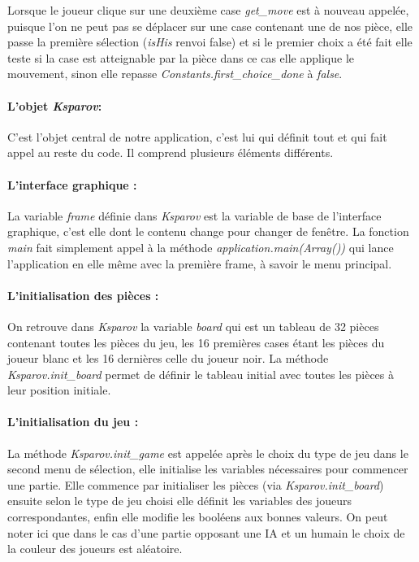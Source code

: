 \documentclass[a4paper]{article}
\begin{document}
Lorsque le joueur clique sur une deuxième case \textit{get\_move} est à nouveau appelée, puisque l'on ne peut pas se déplacer sur une case contenant une de nos pièce, elle passe la première sélection (\textit{isHis} renvoi false) et si le premier choix a été fait elle teste si la case est atteignable par la pièce dans ce cas elle applique le mouvement, sinon elle repasse \textit{Constants.first\_choice\_done} à \textit{false}. 

\paragraph{L'objet \textit{Ksparov}:}C'est l'objet central de notre application, c'est lui qui définit tout et qui fait appel au reste du code. Il comprend plusieurs éléments différents. 

\paragraph{L'interface graphique :}La variable \textit{frame} définie dans \textit{Ksparov} est la variable de base de l'interface graphique, c'est elle dont le contenu change pour changer de fenêtre. La fonction \textit{main} fait simplement appel à la méthode \textit{application.main(Array())} qui lance l'application en elle même avec la première frame, à savoir le menu principal. 

\paragraph{L'initialisation des pièces :}On retrouve dans \textit{Ksparov} la variable \textit{board} qui est un tableau de 32 pièces contenant toutes les pièces du jeu, les 16 premières cases étant les pièces du joueur blanc et les 16 dernières celle du joueur noir. La méthode \textit{Ksparov.init\_board} permet de définir le tableau initial avec toutes les pièces à leur position initiale.

\paragraph{L'initialisation du jeu :}La méthode \textit{Ksparov.init\_game} est appelée après le choix du type de jeu dans le second menu de sélection, elle initialise les variables nécessaires pour commencer une partie. Elle commence par initialiser les pièces (via \textit{Ksparov.init\_board}) ensuite selon le type de jeu choisi elle définit les variables des joueurs correspondantes, enfin elle modifie les booléens aux bonnes valeurs. On peut noter ici que dans le cas d'une partie opposant une IA et un humain le choix de la couleur des joueurs est aléatoire. 
\end{document}
